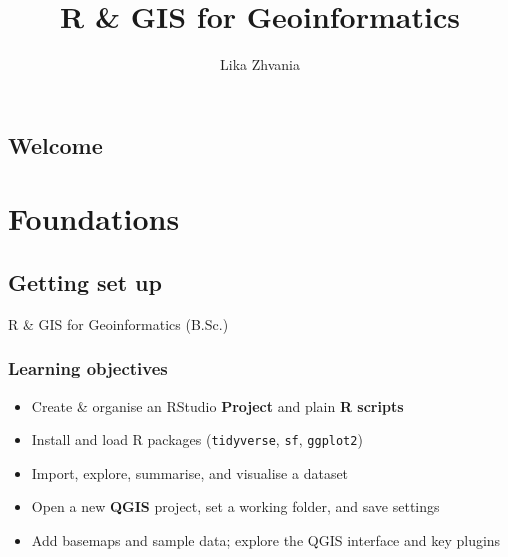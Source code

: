 \documentclass[
  letterpaper,
  DIV=11,
  numbers=noendperiod]{scrreprt}
\title{R \& GIS for Geoinformatics}
\author{Lika Zhvania}
\date{}
\providecommand{\tightlist}{%
  \setlength{\itemsep}{0pt}\setlength{\parskip}{0pt}}\usepackage{longtable,booktabs,array}
\renewcommand*\contentsname{Table of contents}
\newcommand\contentsname{Table of contents}
\begin{document}
\maketitle
\ifdefined\Shaded\renewenvironment{Shaded}{\begin{tcolorbox}[sharp corners, boxrule=0pt, breakable, borderline west={3pt}{0pt}{shadecolor}, enhanced, interior hidden, frame hidden]}{\end{tcolorbox}}\fi

\renewcommand*\contentsname{Table of contents}
{
\hypersetup{linkcolor=}
\setcounter{tocdepth}{2}
\tableofcontents
}

\hypertarget{welcome}{%
\chapter*{Welcome}\label{welcome}}


\part{Foundations}

\hypertarget{getting-set-up}{%
\chapter{Getting set up}\label{getting-set-up}}

R \& GIS for Geoinformatics (B.Sc.)

\hfill\break

\hypertarget{learning-objectives}{%
\section{Learning objectives}\label{learning-objectives}}

\begin{itemize}
\tightlist
\item
  Create \& organise an RStudio \textbf{Project} and plain \textbf{R
  scripts}
\item
  Install and load R packages (\texttt{tidyverse}, \texttt{sf},
  \texttt{ggplot2})
\item
  Import, explore, summarise, and visualise a dataset
\item
  Open a new \textbf{QGIS} project, set a working folder, and save
  settings
\item
  Add basemaps and sample data; explore the QGIS interface and key
  plugins
\end{itemize}
\end{document}
